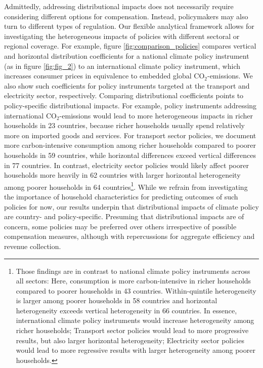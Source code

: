 \documentclass[12pt, a4paper]{article}
\begin{document}
Admittedly, addressing distributional impacts does not necessarily require considering different options for compensation. Instead, policymakers may also turn to different types of regulation. Our flexible analytical framework allows for investigating the heterogeneous impacts of policies with different sectoral or regional coverage. For example, figure \ref{fig:comparison_policies} compares vertical and horizontal distribution coefficients for a national climate policy instrument (as in figure \ref{fig:fig_2}) to an international climate policy instrument, which increases consumer prices in equivalence to embedded global CO$_{2}$-emissions. We also show such coefficients for policy instruments targeted at the transport and electricity sector, respectively. Comparing distributional coefficients points to policy-specific distributional impacts. For example, policy instruments addressing international CO$_{2}$-emissions  \autocite[such as border carbon adjustment, e.g][]{Mehling.2019,Cosbey.2019} would lead to more heterogeneous impacts in richer households in 23 countries, because richer households usually spend relatively more on imported goods and services. For transport sector policies, we document more carbon-intensive consumption among richer households compared to poorer households in 59 countries, while horizontal differences exceed vertical differences in 77 countries. In contrast, electricity sector policies would likely affect poorer households more heavily in 62 countries with larger horizontal heterogeneity among poorer households in 64 countries\footnote{Those findings are in contrast to national climate policy instruments across all sectors: Here, consumption is more carbon-intensive in richer households compared to poorer households in 43 countries. Within-quintile heterogeneity is larger among poorer households in 58 countries and horizontal heterogeneity exceeds vertical heterogeneity in 66 countries. In essence, international climate policy instruments would increase heterogeneity among richer households; Transport sector policies would lead to more progressive results, but also larger horizontal heterogeneity; Electricity sector policies would lead to more regressive results with larger heterogeneity among poorer households.}. While we refrain from investigating the importance of household characteristics for predicting outcomes of such policies for now, our results underpin that distributional impacts of climate policy are country- and policy-specific. Presuming that distributional impacts are of concern, some policies may be preferred over others irrespective of possible compensation measures, although with repercussions for aggregate efficiency and revenue collection. 
\end{document}
